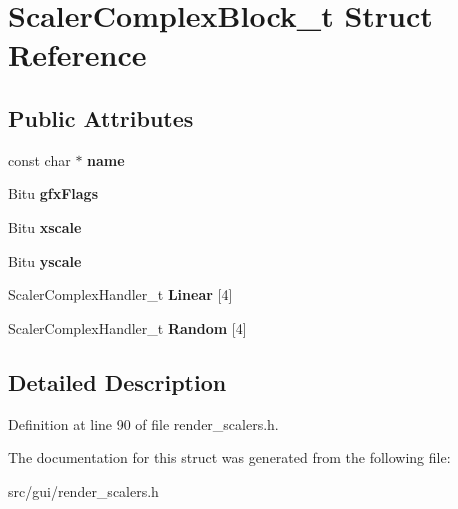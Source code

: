 \hypertarget{structScalerComplexBlock__t}{\section{Scaler\-Complex\-Block\-\_\-t Struct Reference}
\label{structScalerComplexBlock__t}
}
\subsection*{Public Attributes}
\begin{DoxyCompactItemize}
\item 
\hypertarget{structScalerComplexBlock__t_af8c81fab48a4d87ce960686d6625da87}{const char $\ast$ {\bfseries name}}\label{structScalerComplexBlock__t_af8c81fab48a4d87ce960686d6625da87}

\item 
\hypertarget{structScalerComplexBlock__t_a86e085556ec683daec62f5f911ae5284}{Bitu {\bfseries gfx\-Flags}}\label{structScalerComplexBlock__t_a86e085556ec683daec62f5f911ae5284}

\item 
\hypertarget{structScalerComplexBlock__t_a167ae943d3d005007812ebbd9def1e0f}{Bitu {\bfseries xscale}}\label{structScalerComplexBlock__t_a167ae943d3d005007812ebbd9def1e0f}

\item 
\hypertarget{structScalerComplexBlock__t_a0c97b9521ff1cbd39784a5fd8fe4b613}{Bitu {\bfseries yscale}}\label{structScalerComplexBlock__t_a0c97b9521ff1cbd39784a5fd8fe4b613}

\item 
\hypertarget{structScalerComplexBlock__t_a752b0a7f66e14e8878766ced311678c3}{Scaler\-Complex\-Handler\-\_\-t {\bfseries Linear} \mbox{[}4\mbox{]}}\label{structScalerComplexBlock__t_a752b0a7f66e14e8878766ced311678c3}

\item 
\hypertarget{structScalerComplexBlock__t_a96d139ee942cff244bd45d16f6201e90}{Scaler\-Complex\-Handler\-\_\-t {\bfseries Random} \mbox{[}4\mbox{]}}\label{structScalerComplexBlock__t_a96d139ee942cff244bd45d16f6201e90}

\end{DoxyCompactItemize}


\subsection{Detailed Description}


Definition at line 90 of file render\-\_\-scalers.\-h.



The documentation for this struct was generated from the following file\-:\begin{DoxyCompactItemize}
\item 
src/gui/render\-\_\-scalers.\-h\end{DoxyCompactItemize}
